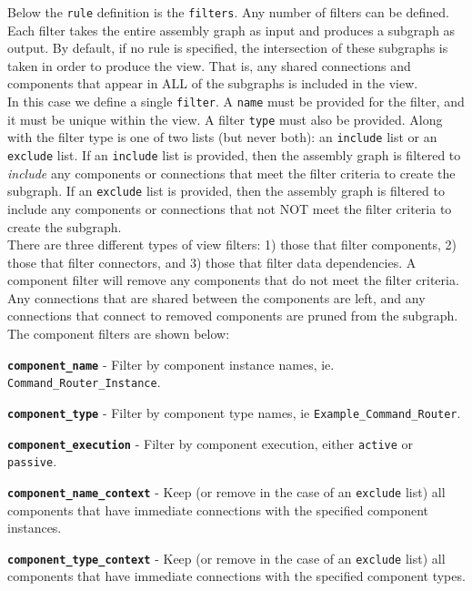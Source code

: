 Below the \texttt{rule} definition is the \texttt{filters}. Any number of filters can be defined. Each filter takes the entire assembly graph as input and produces a subgraph as output. By default, if no rule is specified, the intersection of these subgraphs is taken in order to produce the view. That is, any shared connections and components that appear in ALL of the subgraphs is included in the view. \\

In this case we define a single \texttt{filter}. A \texttt{name} must be provided for the filter, and it must be unique within the view. A filter \texttt{type} must also be provided. Along with the filter type is one of two lists (but never both): an \texttt{include} list or an \texttt{exclude} list. If an \texttt{include} list is provided, then the assembly graph is filtered to \textit{include} any components or connections that meet the filter criteria to create the subgraph. If an \texttt{exclude} list is provided, then the assembly graph is filtered to include any components or connections that not NOT meet the filter criteria to create the subgraph. \\

There are three different types of view filters: 1) those that filter components, 2) those that filter connectors, and 3) those that filter data dependencies. A component filter will remove any components that do not meet the filter criteria. Any connections that are shared between the components are left, and any connections that connect to removed components are pruned from the subgraph. The component filters are shown below:

\vspace{5mm} %
\begin{spaceditemize}
  \item \textbf{\texttt{component\_name}} - Filter by component instance names, ie. \texttt{Command\_Router\_Instance}.
  \item \textbf{\texttt{component\_type}} - Filter by component type names, ie \texttt{Example\_Command\_Router}.
  \item \textbf{\texttt{component\_execution}} - Filter by component execution, either \texttt{active} or \texttt{passive}.
  \item \textbf{\texttt{component\_name\_context}} - Keep (or remove in the case of an \texttt{exclude} list) all components that have immediate connections with the specified component instances.
  \item \textbf{\texttt{component\_type\_context}} - Keep (or remove in the case of an \texttt{exclude} list) all components that have immediate connections with the specified component types.
\end{spaceditemize}
\vspace{5mm} %

